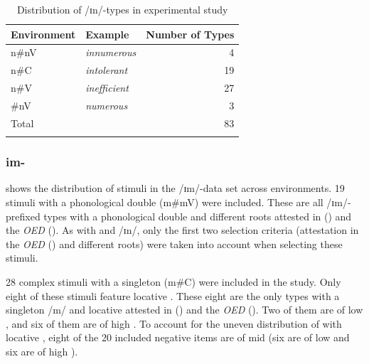 \begin{table}
	\caption{Distribution of /ɪn/-types in experimental study}
	\label{tbl:distribution of in  types in experiment}

	
		\begin{tabular} {llr}
\lsptoprule
			Environment & Example & Number of  Types\\

			\midrule
			n\#nV&\color{lsMidBlue}\textit{innumerous} & 4 \\ 

			n\#C&\color{lsMidBlue}\textit{intolerant} & 19 \\ 
						n\#V&\color{lsMidBlue}\textit{inefficient} & 27 \\ 
			\#nV&\color{lsMidBlue}\textit{numerous} & 3\\ 
			\midrule   
			Total&  & 83 \\ 
			\lspbottomrule                                                                                
		\end{tabular}
	
\end{table}


\subsubsection{im-}

 shows the distribution of  stimuli in the /ɪm/-data set across environments. 19 stimuli with a phonological double ({m\#mV}) were included. These are all /ɪm/-prefixed types with a phonological double and different roots attested in  (\citealt{Davies.20082014}) and the \textit{OED} (\citealt{OED.2013}). As with  and /ɪn/, only the first two selection criteria (attestation in the \textit{OED} (\citealt{OED.2013}) and different roots) were taken into account when selecting these stimuli.


28 complex stimuli with a singleton ({m\#C}) were included in the study. Only eight of these stimuli feature locative . These eight are the only types with a singleton /m/ and locative  attested in  (\citealt{Davies.20082014}) and the \textit{OED} (\citealt{OED.2013}). Two of them are of low , and six of them are of high .
 To account for the uneven distribution of  with locative , eight of the 20 included negative items are of mid  (six are of low and six are of high ).


